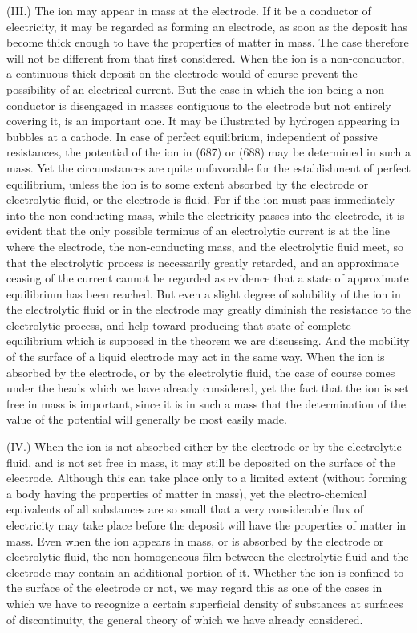 \documentclass[12pt]{article}
\begin{document}
(III.) The ion may appear in mass at the electrode. If it be a conductor of electricity, it may be regarded as forming an electrode, as soon as the deposit has become thick enough to have the properties of matter in mass. The case therefore will not be different from that first considered. When the ion is a non-conductor, a continuous thick deposit on the electrode would of course prevent the possibility of an electrical current. But the case in which the ion being a non-conductor is disengaged in masses contiguous to the electrode but not entirely covering it, is an important one. It may be illustrated by hydrogen appearing in bubbles at a cathode. In case of perfect equilibrium, independent of passive resistances, the potential of the ion in (687) or (688) may be determined in such a mass. Yet the circumstances are quite unfavorable for the establishment of perfect equilibrium, unless the ion is to some extent absorbed by the electrode or electrolytic fluid, or the electrode is fluid. For if the ion must pass immediately into the non-conducting mass, while the electricity passes into the electrode, it is evident that the only possible terminus of an electrolytic current is at the line where the electrode, the non-conducting mass, and the electrolytic fluid meet, so that the electrolytic process is necessarily greatly retarded, and an approximate ceasing of the current cannot be regarded as evidence that a state of approximate equilibrium has been reached. But even a slight degree of solubility of the ion in the electrolytic fluid or in the electrode may greatly diminish the resistance to the electrolytic process, and help toward producing that state of complete equilibrium which is supposed in the theorem we are discussing. And the mobility of the surface of a liquid electrode may act in the same way. When the ion is absorbed by the electrode, or by the electrolytic fluid, the case of course comes under the heads which we have already considered, yet the fact that the ion is set free in mass is important, since it is in such a mass that the determination of the value of the potential will generally be most easily made.

(IV.) When the ion is not absorbed either by the electrode or by the electrolytic fluid, and is not set free in mass, it may still be deposited on the surface of the electrode. Although this can take place only to a limited extent (without forming a body having the properties of matter in mass), yet the electro-chemical equivalents of all substances are so small that a very considerable flux of electricity may take place before the deposit will have the properties of matter in mass. Even when the ion appears in mass, or is absorbed by the electrode or electrolytic fluid, the non-homogeneous film between the electrolytic fluid and the electrode may contain an additional portion of it. Whether the ion is confined to the surface of the electrode or not, we may regard this as one of the cases in which we have to recognize a certain superficial density of substances at surfaces of discontinuity, the general theory of which we have already considered. 
\end{document}
